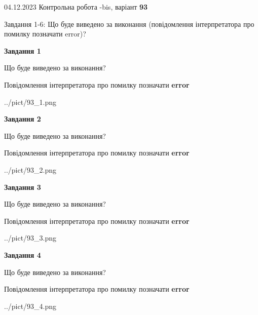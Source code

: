 \documentclass[12pt, ukrainian]{article}
\begin{document}
{{04.12.2023 Контрольна робота -bis, варіант  \No \textbf { 93 }\par}}
{

Завдання 1-6: Що буде виведено за виконання (повідомлення інтерпретатора про помилку позначати error)?


{\begin {center}\textbf{Завдання 1}\end {center}}\par
Що буде виведено за виконання? \par
Повідомлення інтерпретатора про помилку позначати \textbf{error}

\begin{center}
	{../pict/93_1.png}
\end{center}
\newpage

{\begin {center}\textbf{Завдання 2}\end {center}}\par
Що буде виведено за виконання? \par
Повідомлення інтерпретатора про помилку позначати \textbf{error}

\begin{center}
	{../pict/93_2.png}
\end{center}
\newpage

{\begin {center}\textbf{Завдання 3}\end {center}}\par
Що буде виведено за виконання? \par
Повідомлення інтерпретатора про помилку позначати \textbf{error}

\begin{center}
	{../pict/93_3.png}
\end{center}
\newpage

{\begin {center}\textbf{Завдання 4}\end {center}}\par
Що буде виведено за виконання? \par
Повідомлення інтерпретатора про помилку позначати \textbf{error}

\begin{center}
	{../pict/93_4.png}
\end{center}
\newpage

}
\end{document}
